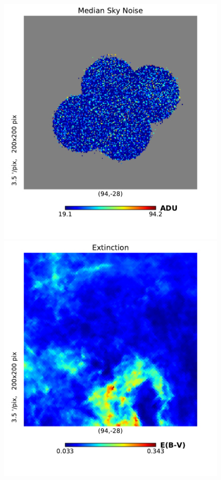 \documentclass[\docopts]{\docclass}
\begin{document}
\begin{figure}
\includegraphics[width=0.9\columnwidth]{median_skynoise_2048.pdf}
\includegraphics[width=0.9\columnwidth]{extinction_SFD.pdf}

\end{figure}
\end{document}
